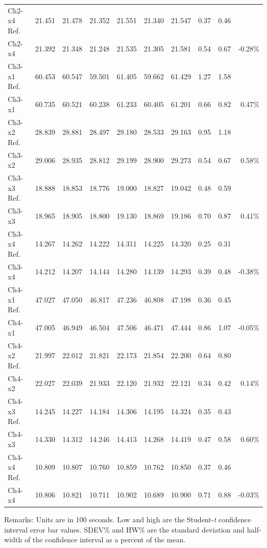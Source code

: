 \begin{table}[htbp]
\begin{center}
\begin{tabular}{
			l
			S[table-format=3.3]
			S[table-format=3.3]
			S[table-format=3.3]
			S[table-format=3.3]
			S[table-format=3.3]
			S[table-format=3.3]
			S[table-format=1.2]
			S[table-format=1.2]
			r}
Ch2-x4 Ref. & 21.451  & 21.478  & 21.352  & 21.551  & 21.340  & 21.547  & 0.37  & 0.46 & \\
Ch2-x4 & 21.392  & 21.348  & 21.248  & 21.535  & 21.305  & 21.581  & 0.54  & 0.67 & -0.28\% \\
Ch3-x1 Ref. & 60.453  & 60.547  & 59.501  & 61.405  & 59.662  & 61.429  & 1.27  & 1.58 & \\
Ch3-x1 & 60.735  & 60.521  & 60.238  & 61.233  & 60.405  & 61.201  & 0.66  & 0.82 & 0.47\% \\
Ch3-x2 Ref. & 28.839  & 28.881  & 28.497  & 29.180  & 28.533  & 29.163  & 0.95  & 1.18 & \\
Ch3-x2 & 29.006  & 28.935  & 28.812  & 29.199  & 28.900  & 29.273  & 0.54  & 0.67 & 0.58\% \\
Ch3-x3 Ref. & 18.888  & 18.853  & 18.776  & 19.000  & 18.827  & 19.042  & 0.48  & 0.59 & \\
Ch3-x3 & 18.965  & 18.905  & 18.800  & 19.130  & 18.869  & 19.186  & 0.70  & 0.87 & 0.41\% \\
Ch3-x4 Ref. & 14.267  & 14.262  & 14.222  & 14.311  & 14.225  & 14.320  & 0.25  & 0.31 & \\
Ch3-x4 & 14.212  & 14.207  & 14.144  & 14.280  & 14.139  & 14.293  & 0.39  & 0.48 & -0.38\% \\
Ch4-x1 Ref. & 47.027  & 47.050  & 46.817  & 47.236  & 46.808  & 47.198  & 0.36  & 0.45 & \\
Ch4-x1 & 47.005  & 46.949  & 46.504  & 47.506  & 46.471  & 47.444  & 0.86  & 1.07 & -0.05\% \\
Ch4-x2 Ref. & 21.997  & 22.012  & 21.821  & 22.173  & 21.854  & 22.200  & 0.64  & 0.80 & \\
Ch4-x2 & 22.027  & 22.039  & 21.933  & 22.120  & 21.932  & 22.121  & 0.34  & 0.42 & 0.14\% \\
Ch4-x3 Ref. & 14.245  & 14.227  & 14.184  & 14.306  & 14.195  & 14.324  & 0.35  & 0.43 & \\
Ch4-x3 & 14.330  & 14.312  & 14.246  & 14.413  & 14.268  & 14.419  & 0.47  & 0.58 & 0.60\% \\
Ch4-x4 Ref. & 10.809  & 10.807  & 10.760  & 10.859  & 10.762  & 10.850  & 0.37  & 0.46 & \\
Ch4-x4 & 10.806  & 10.821  & 10.711  & 10.902  & 10.689  & 10.900  & 0.71  & 0.88 & -0.03\% \\

		\bottomrule
	\end{tabular}
	\hspace*{-10cm}
	\end{center}
	
	Remarks: Units are in 100 seconds. Low and high are the Student-\textit{t} confidence interval error bar values. SDEV\% and HW\% are the standard deviation and half-width of the confidence interval as a percent of the mean.
\end{table}%




